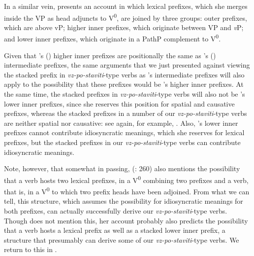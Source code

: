 \documentclass[output=paper,colorlinks,citecolor=brown]{langscibook}
\begin{document}
 In a similar vein, \citet{markova2011nature} presents an account in which lexical prefixes, which she merges inside the VP as head adjuncts to V\textsuperscript{0}, are joined by three groups: outer prefixes, which are above vP; higher inner prefixes, which originate between VP and \textit{v}P; and lower inner prefixes, which originate in a PathP complement to V\textsuperscript{0}.
 
 Given that \citeauthor{markova2011nature}'s  (\citeyear{markova2011nature}) higher inner prefixes are positionally the same as \citeauthor{tatevosov2008intermediate}'s  (\citeyear{tatevosov2008intermediate}) intermediate prefixes, the same arguments that we just presented against viewing the stacked prefix in \textit{vz-po-staviti}-type verbs as \citeauthor{tatevosov2008intermediate}'s intermediate prefixes will also apply to the possibility that these prefixes would be \citeauthor{markova2011nature}'s higher inner prefixes. At the same time, the stacked prefixes in \textit{vz-po-staviti}-type verbs will also not be \citeauthor{markova2011nature}'s lower inner prefixes, since she reserves this position for spatial and causative prefixes, whereas the stacked prefixes in a number of our \textit{vz-po-staviti}-type verbs are neither spatial nor causative: see again, for example, . Also, \citeauthor{markova2011nature}'s lower inner prefixes cannot contribute idiosyncratic meanings, which she reserves for lexical prefixes, but the stacked prefixes in our \textit{vz-po-staviti}-type verbs can contribute idiosyncratic meanings.
 
 Note, however, that somewhat in passing, \citeauthor{markova2011nature} (\citeyear{markova2011nature}: 260) also mentions the possibility that a verb hosts two lexical prefixes, in a V\textsuperscript{0} combining two prefixes and a verb, that is, in a V\textsuperscript{0} to which two prefix heads have been adjoined. From what we can tell, this structure, which assumes the possibility for idiosyncratic meanings for both prefixes, can actually successfully derive our \textit{vz-po-staviti}-type verbs. Though \citeauthor{markova2011nature} does not mention this, her account probably also predicts the possibility that a verb hosts a lexical prefix as well as a stacked lower inner prefix, a structure that presumably can derive some of our \textit{vz-po-staviti}-type verbs. We return to this in .
 
\end{document}
